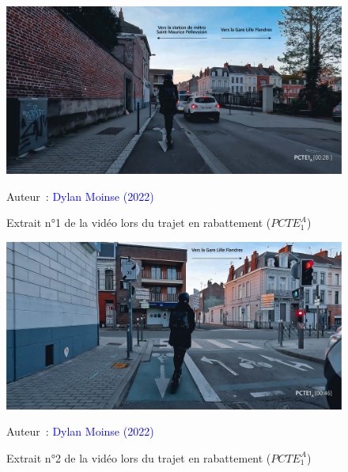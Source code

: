     \begin{figure}[h!]\vspace*{4pt}
        \caption*{Extrait n°1 de la vidéo lors du trajet en rabattement (\(PCTE^{A}_{1}\))}
        \centerline{\includegraphics[width=0.75\columnwidth]{src/Figures/Annexes/Extrait_Video_PCTE1_Access_1.jpg}}
        \vspace{5pt}
        \begin{flushright}\scriptsize{
        Auteur~: \textcolor{blue}{Dylan Moinse (2022)}
        }\end{flushright}
    \end{figure}

    \begin{figure}[h!]\vspace*{4pt}
        \caption*{Extrait n°2 de la vidéo lors du trajet en rabattement (\(PCTE^{A}_{1}\))}
        \centerline{\includegraphics[width=0.75\columnwidth]{src/Figures/Annexes/Extrait_Video_PCTE1_Access_2.jpg}}
        \vspace{5pt}
        \begin{flushright}\scriptsize{
        Auteur~: \textcolor{blue}{Dylan Moinse (2022)}
        }\end{flushright}
    \end{figure}


